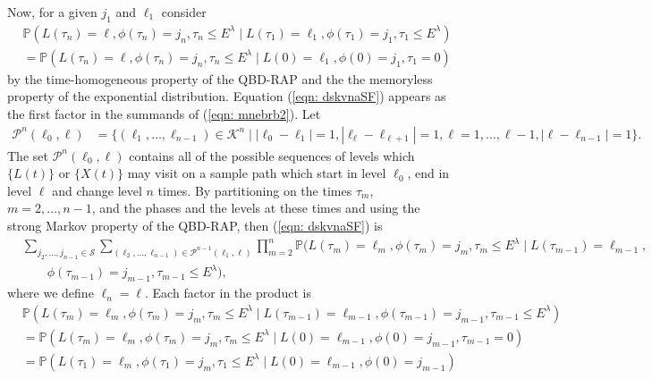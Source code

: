 Now, for a given \(j_1\) and \(\ell_1\) consider 
\begin{align}
	&\mathbb P(L(\tau_n) = \ell, \phi(\tau_n) = j_n, \tau_{n}\leq E^\lambda 
	 \mid L(\tau_1)=\ell_1, 
	 \phi(\tau_1)=j_1, \tau_1\leq E^\lambda) \nonumber 
	\\&=\mathbb P(L(\tau_n) = \ell, \phi(\tau_n) = j_n, \tau_{n}\leq E^\lambda 
	 \mid L(0)=\ell_1, 
	 \phi(0)=j_1, \tau_1=0)\label{eqn: dskvnaSF}
\end{align}
by the time-homogeneous property of the QBD-RAP and the the memoryless property of the exponential distribution.
Equation (\ref{eqn: dskvnaSF}) appears as the first factor in the summands of (\ref{eqn: mnebrb2}). Let 
\begin{align}\label{eqn: paths set1}
	\mathcal P^n(\ell_0,\ell)&=\{(\ell_1,\dots,\ell_{n-1}) \in \mathcal K^n\mid |\ell_0-\ell_1|=1,|\ell_\ell-\ell_{\ell+1}|=1,\ell = 1,\dots,\ell-1,|\ell-\ell_{n-1}|=1\}.
\end{align}
The set \(\mathcal P^n(\ell_0,\ell)\) contains all of the possible sequences of levels which \(\{L(t)\}\) or \(\{X(t)\}\) may visit on a sample path which start in level \(\ell_0\), end in level \(\ell\) and change level \(n\) times. By partitioning on the times \(\tau_m\), \(m=2,\dots,n-1\), and the phases and the levels at these times and using the strong Markov property of the QBD-RAP, then (\ref{eqn: dskvnaSF}) is  
	\begin{align}
	 &\sum_{j_2,\dots,j_{n-1}\in\mathcal S}\sum_{(\ell_2,\dots,\ell_{n-1}) \in\mathcal P^{n-1}(\ell_1,\ell)}\prod_{m=2}^{n}\mathbb P(L(\tau_m) = \ell_m, \phi(\tau_m) = j_m, \tau_{m}\leq E^\lambda 
            	 \mid L(\tau_{m-1}) = \ell_{m-1}, \nonumber
	 	 \\&\qquad\phi(\tau_{m-1}) = j_{m-1}, \tau_{m-1}\leq E^\lambda),  \label{eqn: 161222}
\end{align}
where we define \(\ell_n=\ell\). Each factor in the product is 
\begin{align}
	&\mathbb P(L(\tau_m) = \ell_m, \phi(\tau_m) = j_m, \tau_{m}\leq E^\lambda 
            	 \mid L(\tau_{m-1}) = \ell_{m-1}, \nonumber
	 	 \phi(\tau_{m-1}) = j_{m-1}, \tau_{m-1}\leq E^\lambda)
	\\&=\mathbb P(L(\tau_m) = \ell_m, \phi(\tau_m) = j_m, \tau_{m}\leq E^\lambda 
            	 \mid L(0) = \ell_{m-1}, 
	 	 \phi(0) = j_{m-1}, \tau_{m-1}=0)\nonumber
	\\&=\mathbb P(L(\tau_1) = \ell_m, \phi(\tau_1) = j_m, \tau_{1}\leq E^\lambda 
            	 \mid L(0) = \ell_{m-1}, 
	 	 \phi(0) = j_{m-1})\label{eqn: kk}
\end{align}
